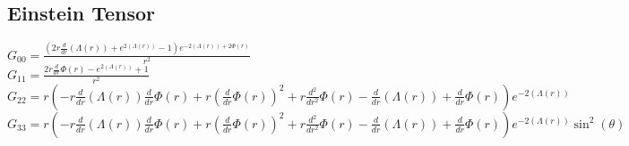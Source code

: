 \documentclass{article}
\begin{document}
\subsection*{Einstein Tensor}
$G_{00} = \frac{\left(2 r \frac{d}{d r} \left(\Lambda{\left(r \right)}\right) + e^{2 \left(\Lambda{\left(r \right)}\right)} - 1\right) e^{- 2 \left(\Lambda{\left(r \right)}\right) + 2 \Phi{\left(r \right)}}}{r^{2}}$\\
$G_{11} = \frac{2 r \frac{d}{d r} \Phi{\left(r \right)} - e^{2 \left(\Lambda{\left(r \right)}\right)} + 1}{r^{2}}$\\
$G_{22} = r \left(- r \frac{d}{d r} \left(\Lambda{\left(r \right)}\right) \frac{d}{d r} \Phi{\left(r \right)} + r \left(\frac{d}{d r} \Phi{\left(r \right)}\right)^{2} + r \frac{d^{2}}{d r^{2}} \Phi{\left(r \right)} - \frac{d}{d r} \left(\Lambda{\left(r \right)}\right) + \frac{d}{d r} \Phi{\left(r \right)}\right) e^{- 2 \left(\Lambda{\left(r \right)}\right)}$\\
$G_{33} = r \left(- r \frac{d}{d r} \left(\Lambda{\left(r \right)}\right) \frac{d}{d r} \Phi{\left(r \right)} + r \left(\frac{d}{d r} \Phi{\left(r \right)}\right)^{2} + r \frac{d^{2}}{d r^{2}} \Phi{\left(r \right)} - \frac{d}{d r} \left(\Lambda{\left(r \right)}\right) + \frac{d}{d r} \Phi{\left(r \right)}\right) e^{- 2 \left(\Lambda{\left(r \right)}\right)} \sin^{2}{\left(\theta \right)}$\\
\end{document}
